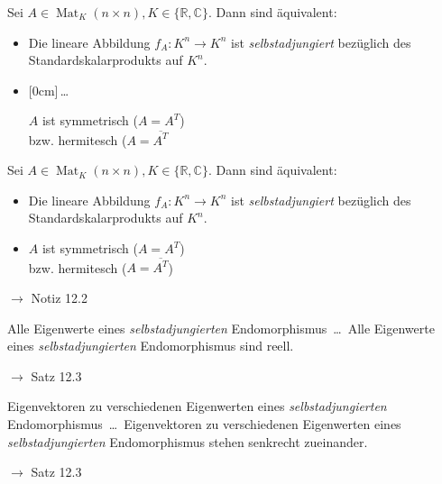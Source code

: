 \documentclass[11pt]{article}
\renewcommand{\cite}[1]{\par\bigskip\hfill{\color{gray}\tiny\(\to\) #1}}
\newcommand{\CC}{\mathbb{C}}
\newcommand{\RR}{\mathbb{R}}
\DeclareMathOperator{\Mat}{Mat}
\newcommand{\hide}[1]{\parbox{0cm}{\raisebox{-7pt}[0cm]{\dots}}\color{white}#1\color{black}}
\let\olddots\dots
\renewcommand{\dots}{\,\olddots\,}
\newenvironment{field}{}{\newpage}
\newif\ifnote
\newenvironment{note}{\notetrue}{\notefalse}
\newcommand{\localtag}{}
\newcommand{\globaltag}{}
\newcommand{\uuid}{}
\newcommand{\tags}[1]{
    \ifnote
        \renewcommand{\localtag}{#1}
    \else
        \renewcommand{\globaltag}{#1}
    \fi
    }
\newcommand{\xplain}[1]{\renewcommand{\uuid}{#1}}
\begin{document}
\begin{note}
    \begin{field}
        Sei $A\in \Mat_K(n\times n), K\in\{\RR,\CC\}$. Dann sind äquivalent:
        \begin{itemize}
            \item Die lineare Abbildung $f_A: K^n\longrightarrow K^n$ ist \emph{selbstadjungiert} bezüglich des Standardskalarprodukts auf $K^n$.
            \item \hide{$A$ ist symmetrisch ($A = A^T$) \\ bzw. hermitesch ($A = \overline{A^T}$}
        \end{itemize}
    \end{field}
    \begin{field}
        Sei $A\in \Mat_K(n\times n), K\in\{\RR,\CC\}$. Dann sind äquivalent:
        \begin{itemize}
            \item Die lineare Abbildung $f_A: K^n\longrightarrow K^n$ ist \emph{selbstadjungiert} bezüglich des Standardskalarprodukts auf $K^n$.
            \item $A$ ist symmetrisch ($A = A^T$) \\ bzw. hermitesch ($A = \overline{A^T}$)
        \end{itemize}
        \cite{Notiz 12.2}
    \end{field}
\end{note}

\begin{note}
    \tags{Satz}
    \xplain{eaa8db5e-c790-11ec-9d64-0242ac120002}
    \begin{field}
        Alle Eigenwerte eines \emph{selbstadjungierten} Endomorphismus \dots
    \end{field}
    \begin{field}
        Alle Eigenwerte eines \emph{selbstadjungierten} Endomorphismus sind reell.
        \cite{Satz 12.3}
    \end{field}

    \begin{field}
        Eigenvektoren zu verschiedenen Eigenwerten eines \emph{selbstadjungierten} Endomorphismus \dots
    \end{field}
    \begin{field}
        Eigenvektoren zu verschiedenen Eigenwerten eines \emph{selbstadjungierten} Endomorphismus stehen senkrecht zueinander.
        \cite{Satz 12.3}
    \end{field}
\end{note}
\end{document}
